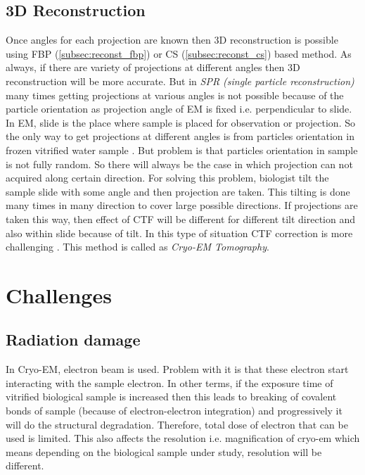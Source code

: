 \documentclass[twoside]{iitbreport}
\begin{document}
\subsection{3D Reconstruction}
Once angles for each projection are known then 3D reconstruction is possible using FBP (\ref{subsec:reconst_fbp}) or CS (\ref{subsec:reconst_cs}) based method. As always, if there are variety of projections at different angles then 3D reconstruction will be more accurate. But in \textit{SPR (single particle reconstruction)} \cite{sigworth2016principles} many times getting projections at various  angles is not possible because of the particle orientation as projection angle of EM is fixed i.e. perpendicular to slide. In EM, slide is the place where sample is placed for observation or projection. So the only way to get projections at different angles is from particles orientation in frozen vitrified water sample \cite{diebolder2012pushing}. But problem is that particles orientation in sample is not fully random. So there will always be the case in which projection can not acquired along certain direction. For solving this problem, biologist tilt the sample slide with some angle and then projection are taken. This tilting is done many times in many direction to cover large possible directions. If projections are taken this way, then effect of CTF will be different for different tilt direction and also within slide because of tilt. In this type of situation CTF correction is more challenging \cite{diebolder2012pushing}. This method is called as \textit{Cryo-EM Tomography}.

\section{Challenges}
\subsection{Radiation damage}
In Cryo-EM, electron beam is used. Problem with it is that these electron start interacting with the sample electron. In other terms, if the exposure time of vitrified biological sample is increased then this leads to breaking of covalent bonds of sample (because of electron-electron integration) and progressively it will do the structural degradation\cite{diebolder2012pushing}. Therefore, total dose of electron that can be used is limited. This also affects the resolution i.e. magnification of cryo-em which means depending on the biological sample under study, resolution will be different.
\end{document}
